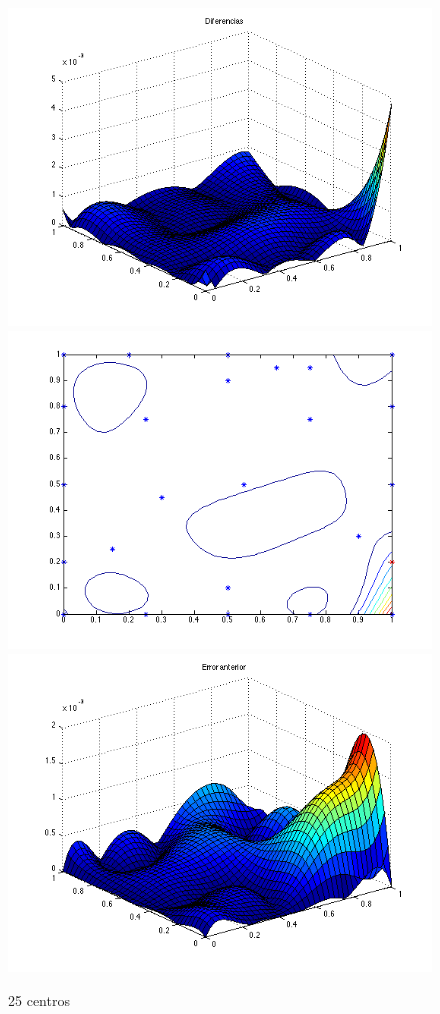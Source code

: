 \documentclass[11pt,a4paper]{article}
\begin{document}
\begin{figure}[H]
\centering

\includegraphics[scale=0.35]{diferencias25.png}
\includegraphics[scale=0.35]{centros25.png}
\includegraphics[scale=0.35]{error25.png}
\caption{25 centros}
\end{figure}
\end{document}

